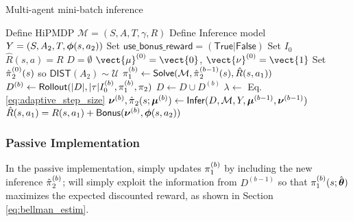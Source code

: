 \begin{algorithm}
    \caption{Multi-agent mini-batch inference}
    \label{alg:multi_agent_batch}
    \begin{algorithmic}[1]
        \State Define \ac{HiPMDP} $\mathcal{M} = (S,A,T,\gamma,R)$
        \State Define Inference model $Y=(S,A_2,T,\boldsymbol{\mathbb{\phi}}(s, a_2))$
        \State Set $\mathsf{use\_bonus\_reward}=(\mathsf{True}|\mathsf{False})$
        \State Set $I_0$
        \State $\hat{R}(s,a) = R$
        \State $D=\emptyset$
        \State $\vect{\mu}^{(0)} = \vect{0}$, $\vect{\nu}^{(0)} = \vect{1}$
        \State Set $\hat{\pi_{}}_2^{(0)}(s)$ so $\mathsf{DIST}(A_2)\sim \mathcal{U}$
        \State $\pi_{1}^{(b)} \leftarrow \mathsf{Solve}(\mathcal{M},
                                                           \hat{\pi_{}}_2^{(b-1)}(s), \hat{R}(s,a_1))$
        \State $D^{(b)} \leftarrow  \mathsf{Rollout}(|D|,|\tau|I_0^{(b)},\pi_{1}^{(b)}, \pi_{2})$
        \State $D \leftarrow D \cup D^{(b)}$
        \State $\lambda \leftarrow $ Eq. \ref{eq:adaptive_step_size}
        \State $\boldsymbol{\mathbb{\nu}}^{(b)} , \hat{\pi_{}}_2(s;\boldsymbol{\mathbb{\mu}}^{(b)}) \leftarrow
                \mathsf{Infer}(D,\mathcal{M},Y,\boldsymbol{\mathbb{\mu}}^{(b-1)}, \boldsymbol{\mathbb{\nu}}^{(b-1)} )$ 
                \State $\hat{R}(s,a_1) = R(s,a_1) +  \mathsf{Bonus}(\boldsymbol{\mathbb{\nu}}^{(b)}, \boldsymbol{\mathbb{\phi}}(s, a_2))$
        \EndIf
        \EndFor
    \end{algorithmic}
\end{algorithm}


\subsubsection{Passive Implementation}
    In the passive implementation,  simply updates $\pi_{1}^{(b)}$ by including the new inference
    $\hat{\pi_{}}_2^{(b)}$;  will simply exploit the information from $D^{(b-1)}$ so that
    $\pi_{1}^{(b)}(s;\hat{\boldsymbol{\mathbb{\theta}}})$ maximizes the expected discounted reward, as shown in Section
    \ref{eq:bellman_estim}.

